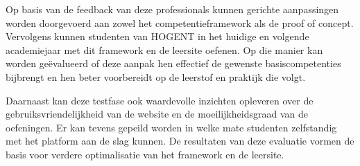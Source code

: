 Op basis van de feedback van deze professionals kunnen gerichte aanpassingen worden doorgevoerd aan zowel het competentieframework als de proof of concept.
Vervolgens kunnen studenten van HOGENT in het huidige en volgende academiejaar met dit framework en de leersite oefenen.
Op die manier kan worden geëvalueerd of deze aanpak hen effectief de gewenste basiscompetenties bijbrengt en hen beter voorbereidt op de leerstof en praktijk die volgt.

Daarnaast kan deze testfase ook waardevolle inzichten opleveren over de gebruiksvriendelijkheid van de website en de moeilijkheidsgraad van de oefeningen.
Er kan tevens gepeild worden in welke mate studenten zelfstandig met het platform aan de slag kunnen.
De resultaten van deze evaluatie vormen de basis voor verdere optimalisatie van het framework en de leersite.






